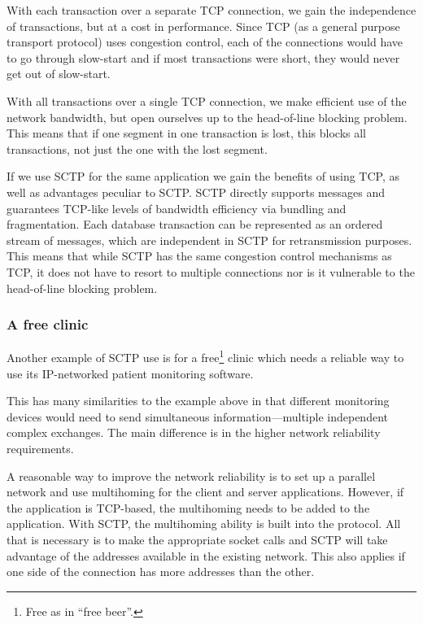 \documentclass[twocolumn]{article}
\begin{document}
With each transaction over a separate TCP connection, we gain the
independence of transactions, but at a cost in performance. Since TCP
(as a general purpose transport protocol) uses congestion control,
each of the connections would have to go through slow-start and if
most transactions were short, they would never get out of slow-start.

With all transactions over a single TCP connection, we make efficient
use of the network bandwidth, but open ourselves up to the
head-of-line blocking problem.  This means that if one segment in one
transaction is lost, this blocks all transactions, not just the one
with the lost segment.

If we use SCTP for the same application we gain the benefits of using
TCP, as well as advantages peculiar to SCTP.  SCTP directly supports
messages and guarantees TCP-like levels of bandwidth efficiency via
bundling and fragmentation.  Each database transaction can be
represented as an ordered stream of messages, which are independent in
SCTP for retransmission purposes.  This means that while SCTP has the
same congestion control mechanisms as TCP, it does not have to resort
to multiple connections nor is it vulnerable to the head-of-line
blocking problem.

\subsubsection{A free clinic}

Another example of SCTP use is for a free\footnote{Free as in ``free
beer''.} clinic which needs a reliable way to use its IP-networked
patient monitoring software.

This has many similarities to the example above in that different
monitoring devices would need to send simultaneous
information---multiple independent complex exchanges.  The main
difference is in the higher network reliability requirements.  

A reasonable way to improve the network reliability is to set up a
parallel network and use multihoming for the client and server
applications. However, if the application is TCP-based, the
multihoming needs to be added to the application.  With SCTP, the
multihoming ability is built into the protocol.  All that is necessary
is to make the appropriate socket calls and SCTP will take advantage
of the addresses available in the existing network.  This also applies
if one side of the connection has more addresses than the other.
\end{document}
